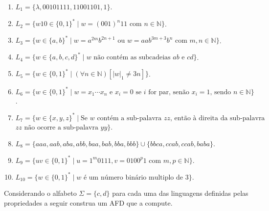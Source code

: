 \begin{enumerate}
	\item $L_1 = \{\lambda, 00101111, 11001101, 1\}$.
	\item $L_2 = \{w10 \in \{0,1\}^* \mid w = (001)^n11 \text{ com } n \in \mathbb{N}\}$.
	\item $L_3 = \{w \in \{a,b\}^* \mid w = a^{2m}b^{2n+1} \text{ ou } w = aab^{3m + 3}b^n \text{ com } m,n \in \mathbb{N}\}$.
	\item $L_4 = \{w \in \{a,b,c,d\}^* \mid w \text{ não contém as subcadeias } ab \text{ e } cd\}$.
	\item $L_5 = \{w \in \{0,1\}^* \mid (\forall n \in \mathbb{N})[|w|_1 \neq 3n]\}$.
	\item $L_6 = \{w \in \{0,1\}^* \mid w = x_1\cdots x_n \text{ e } x_i = 0 \text{ se } i \text{ for par, senão } x_i = 1 \text{, sendo } n \in \mathbb{N}\}$.
	\item $L_7 = \{w \in \{x, y, z\}^* \mid \text{Se } w \text{ contém a sub-palavra } zz \text{, então à  direita da sub-palavra }$ $zz \text{ não ocorre a sub-palavra } yy \}$.
	\item $L_8 = \{aaa, aab, aba, abb, baa, bab, bba, bbb\} \cup \{bbca, ccab, ccab, baba\}$.
	\item $L_9 = \{uv \in \{0,1\}^* \mid u = 1^m0111, v = 0100^p1 \text{ com } m, p \in \mathbb{N}\}$.
	\item $L_{10} = \{w \in \{0,1\}^* \mid w \text{ é um número binário multiplo de  } 3\}$.
\end{enumerate}

\begin{exercise}\label{exerc:LR10}
	Considerando o alfabeto $\Sigma = \{c, d\}$ para cada uma das linguagens definidas pelas propriedades a seguir construa um AFD que a compute.
\end{exercise}

